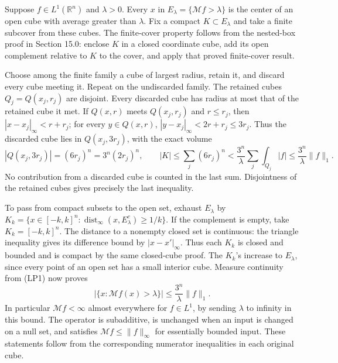 \documentclass[
  11pt,
]{article}
\makeatletter
\newcounter{none} %
\let\ReaderOriginalAnchorStart\hyper@anchorstart
\let\ReaderOriginalAnchorEnd\hyper@anchorend
\let\ReaderPendingAliases\@empty
\def\ReaderArmAliases#1{\gdef\ReaderPendingAliases{#1}}
\def\hyper@anchorstart#1{\ReaderIfNativeAnchorTF{#1}{\ReaderPendingAliases\global\let\ReaderPendingAliases\@empty}{}\ReaderOriginalAnchorStart{#1}}
\makeatother
\begin{document}
Suppose \(f\in L^1(\mathbb R^n)\) and \(\lambda>0\). Every \(x\) in
\(E_\lambda=\{\mathcal Mf>\lambda\}\) is the center of an open cube with
average greater than \(\lambda\). Fix a compact \(K\subset E_\lambda\)
and take a finite subcover from these cubes. The finite-cover property
follows from the nested-box proof in Section 15.0: enclose \(K\) in a
closed coordinate cube, add its open complement relative to \(K\) to the
cover, and apply that proved finite-cover result.

Choose among the finite family a cube of largest radius, retain it, and
discard every cube meeting it. Repeat on the undiscarded family. The
retained cubes \(Q_j=Q(x_j,r_j)\) are disjoint. Every discarded cube has
radius at most that of the retained cube it met. If \(Q(x,r)\) meets
\(Q(x_j,r_j)\) and \(r\leq r_j\), then \(|x-x_j|_\infty<r+r_j\); for
every \(y\in Q(x,r)\), \(|y-x_j|_\infty<2r+r_j\leq3r_j\). Thus the
discarded cube lies in \(Q(x_j,3r_j)\), with the exact volume \[
 |Q(x_j,3r_j)|=(6r_j)^n=3^n(2r_j)^n,\qquad
 |K|\leq\sum_j(6r_j)^n
       <\frac{3^n}{\lambda}\sum_j\int_{Q_j}|f|
       \leq\frac{3^n}{\lambda}\|f\|_1.                        \tag{FI2}
\] No contribution from a discarded cube is counted in the last sum.
Disjointness of the retained cubes gives precisely the last inequality.

To pass from compact subsets to the open set, exhaust \(E_\lambda\) by
\(K_k=\{x\in[-k,k]^n:\operatorname{dist}_\infty(x,E_\lambda^c)\geq1/k\}\).
If the complement is empty, take \(K_k=[-k,k]^n\). The distance to a
nonempty closed set is continuous: the triangle inequality gives its
difference bound by \(|x-x'|_\infty\). Thus each \(K_k\) is closed and
bounded and is compact by the same closed-cube proof. The \(K_k\)'s
increase to \(E_\lambda\), since every point of an open set has a small
interior cube. Measure continuity from (LP1) now proves \[
 |\{x:\mathcal Mf(x)>\lambda\}|
              \leq\frac{3^n}{\lambda}\|f\|_1.                 \tag{FI3}
\] In particular \(\mathcal Mf<\infty\) almost everywhere for
\(f\in L^1\), by sending \(\lambda\) to infinity in this bound. The
operator is subadditive, is unchanged when an input is changed on a null
set, and satisfies \(\mathcal Mf\leq\|f\|_\infty\) for essentially
bounded input. These statements follow from the corresponding numerator
inequalities in each original cube.

\ReaderArmAliases{\ReaderOriginalAnchorStart{AN03-LCE-FRAC-002}\ReaderOriginalAnchorEnd\begingroup\expandafter\def\csname @currentHref\endcsname{AN03-LCE-FRAC-002}\label{AN03-LCE-FRAC-002}\endgroup\ReaderOriginalAnchorStart{the-strong-maximal-bound-without-interpolation}\ReaderOriginalAnchorEnd}
\end{document}
